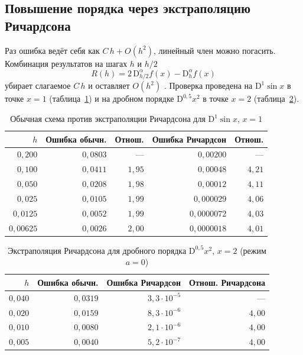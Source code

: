 \documentclass[14pt,a4paper]{extarticle}
\newcommand{\D}{\mathrm{D}}
\begin{document}
\subsection{Повышение порядка через экстраполяцию Ричардсона}

Раз ошибка ведёт себя как $C\,h+O(h^2)$, линейный член можно погасить. Комбинация результатов на шагах $h$ и $h/2$
\begin{equation}
R(h)=2\,\D^{\alpha}_{h/2}f(x)-\D^{\alpha}_{h}f(x)
\end{equation}
убирает слагаемое $C\,h$ и оставляет $O(h^2)$ \cite{podlubny}. Проверка проведена на $\D^1\sin x$ в точке $x=1$ (таблица~\ref{tab:rich}) и на дробном порядке $\D^{0{,}5}x^2$ в точке $x=2$ (таблица~\ref{tab:richfrac}).

\begin{table}[htbp]
\centering
\caption{Обычная схема против экстраполяции Ричардсона для $\D^1\sin x$, $x=1$}
\label{tab:rich}
\begin{tabular}{|r|r|r|r|r|}
\hline
$h$ & Ошибка обычн. & Отнош. & Ошибка Ричардсон & Отнош. \\
\hline
$0{,}200$  & $0{,}0803$ & ---     & $0{,}00200$  & --- \\
\hline
$0{,}100$  & $0{,}0411$ & $1{,}95$& $0{,}00048$  & $4{,}21$ \\
\hline
$0{,}050$  & $0{,}0208$ & $1{,}98$& $0{,}00012$  & $4{,}11$ \\
\hline
$0{,}025$  & $0{,}0105$ & $1{,}99$& $0{,}000029$ & $4{,}06$ \\
\hline
$0{,}0125$ & $0{,}0052$ & $1{,}99$& $0{,}0000072$& $4{,}03$ \\
\hline
$0{,}00625$& $0{,}0026$ & $2{,}00$& $0{,}0000018$& $4{,}01$ \\
\hline
\end{tabular}
\end{table}

\begin{table}[htbp]
\centering
\caption{Экстраполяция Ричардсона для дробного порядка $\D^{0{,}5}x^2$, $x=2$ (режим $a=0$)}
\label{tab:richfrac}
\begin{tabular}{|r|r|r|r|}
\hline
$h$ & Ошибка обычн. & Ошибка Ричардсон & Отнош. Ричардсона \\
\hline
$0{,}040$  & $0{,}0319$ & $3{,}3\cdot10^{-5}$ & --- \\
\hline
$0{,}020$  & $0{,}0159$ & $8{,}3\cdot10^{-6}$ & $4{,}00$ \\
\hline
$0{,}010$  & $0{,}0080$ & $2{,}1\cdot10^{-6}$ & $4{,}00$ \\
\hline
$0{,}005$  & $0{,}0040$ & $5{,}2\cdot10^{-7}$ & $4{,}00$ \\
\hline
\end{tabular}
\end{table}
\end{document}
